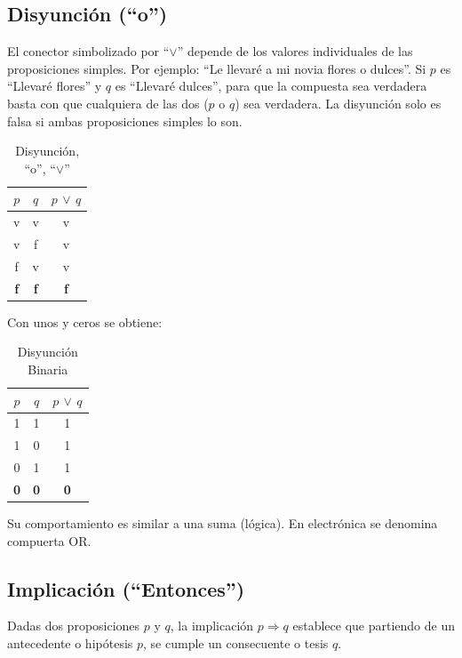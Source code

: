 \subsection{Disyunción (``o'')}

El conector simbolizado por ``$\lor$'' depende de los valores individuales de las proposiciones simples. Por ejemplo: ``Le llevaré a mi novia flores o dulces''. Si $p$ es ``Llevaré flores'' y $q$ es ``Llevaré dulces'', para que la compuesta sea verdadera basta con que cualquiera de las dos ($p$ o $q$) sea verdadera. La disyunción solo es falsa si ambas proposiciones simples lo son.

\begin{table}[ht]
\caption{Disyunción, ``o'', ``$\lor$''}\label{tabla:disyuncion}
\centering
\begin{tabular}{|c|c|c|}
\hline
$p$ & $q$ & $p$ $\lor$ $q$ \\ \hline
v   & v   & v              \\ \hline
v   & f   & v              \\ \hline
f   & v   & v              \\ \hline
\textbf{f}   & \textbf{f}   & \textbf{f}              \\ \hline
\end{tabular}
\end{table}

Con unos y ceros se obtiene:

\begin{table}[ht]
\caption{Disyunción Binaria}\label{tabla:disyuncion_bin}
\centering
\begin{tabular}{|c|c|c|}
\hline
$p$ & $q$ & $p$ $\lor$ $q$ \\ \hline
1   & 1   & 1               \\ \hline
1   & 0   & 1               \\ \hline
0   & 1   & 1               \\ \hline
\textbf{0}   & \textbf{0}   & \textbf{0}               \\ \hline
\end{tabular}
\end{table}
Su comportamiento es similar a una suma (lógica). En electrónica se denomina compuerta OR.

\subsection{Implicación (``Entonces'')}

Dadas dos proposiciones $p$ y $q$, la implicación $p\Rightarrow q$ establece que partiendo de un antecedente o hipótesis $p$, se cumple un consecuente o tesis $q$.

